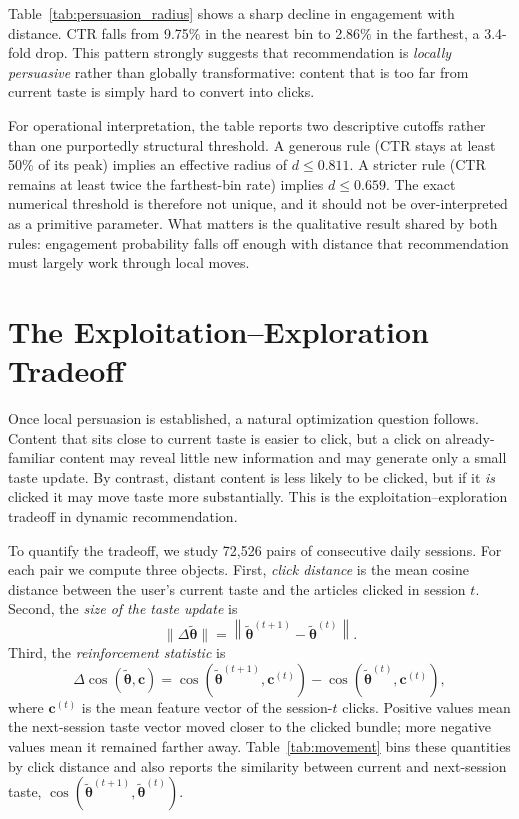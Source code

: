 \documentclass[11pt]{article}
\begin{document}
Table~\ref{tab:persuasion_radius} shows a sharp decline in engagement with distance. CTR falls from 9.75\% in the nearest bin to 2.86\% in the farthest, a 3.4-fold drop. This pattern strongly suggests that recommendation is \emph{locally persuasive} rather than globally transformative: content that is too far from current taste is simply hard to convert into clicks.

For operational interpretation, the table reports two descriptive cutoffs rather than one purportedly structural threshold. A generous rule (CTR stays at least 50\% of its peak) implies an effective radius of $d \le 0.811$. A stricter rule (CTR remains at least twice the farthest-bin rate) implies $d \le 0.659$. The exact numerical threshold is therefore not unique, and it should not be over-interpreted as a primitive parameter. What matters is the qualitative result shared by both rules: engagement probability falls off enough with distance that recommendation must largely work through local moves.

\section{The Exploitation--Exploration Tradeoff}
\label{sec:tradeoff}

Once local persuasion is established, a natural optimization question follows. Content that sits close to current taste is easier to click, but a click on already-familiar content may reveal little new information and may generate only a small taste update. By contrast, distant content is less likely to be clicked, but if it \emph{is} clicked it may move taste more substantially. This is the exploitation--exploration tradeoff in dynamic recommendation.

To quantify the tradeoff, we study 72,526 pairs of consecutive daily sessions. For each pair we compute three objects. First, \emph{click distance} is the mean cosine distance between the user's current taste and the articles clicked in session $t$. Second, the \emph{size of the taste update} is
\[
\|\Delta\tilde{\boldsymbol{\theta}}\|
=
\left\|
\tilde{\boldsymbol{\theta}}^{(t+1)}
-
\tilde{\boldsymbol{\theta}}^{(t)}
\right\|.
\]
Third, the \emph{reinforcement statistic} is
\[
\Delta\cos(\tilde{\boldsymbol{\theta}},\mathbf{c})
=
\cos\!\left(\tilde{\boldsymbol{\theta}}^{(t+1)},\mathbf{c}^{(t)}\right)
-
\cos\!\left(\tilde{\boldsymbol{\theta}}^{(t)},\mathbf{c}^{(t)}\right),
\]
where $\mathbf{c}^{(t)}$ is the mean feature vector of the session-$t$ clicks. Positive values mean the next-session taste vector moved closer to the clicked bundle; more negative values mean it remained farther away. Table~\ref{tab:movement} bins these quantities by click distance and also reports the similarity between current and next-session taste, $\cos(\tilde{\boldsymbol{\theta}}^{(t+1)},\tilde{\boldsymbol{\theta}}^{(t)})$.
\end{document}
